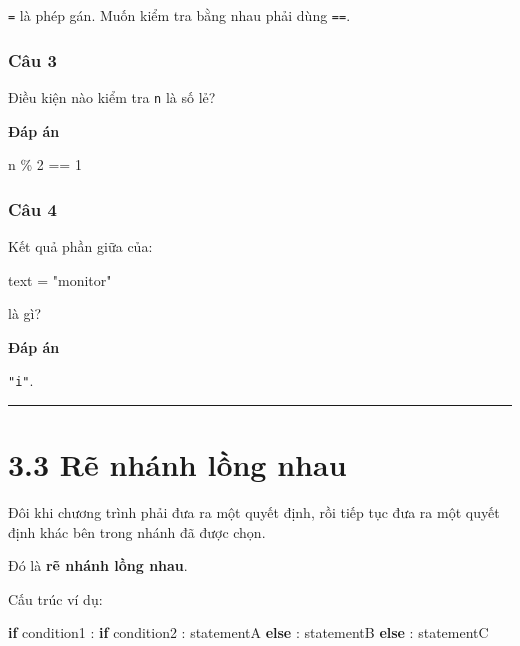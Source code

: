 \documentclass[
  11pt,
  a4paper,
]{article}
\newenvironment{Shaded}{}{}
\newcommand{\ControlFlowTok}[1]{\textcolor[rgb]{0.00,0.44,0.13}{\textbf{#1}}}
\newcommand{\DecValTok}[1]{\textcolor[rgb]{0.25,0.63,0.44}{#1}}
\newcommand{\NormalTok}[1]{#1}
\newcommand{\OperatorTok}[1]{\textcolor[rgb]{0.40,0.40,0.40}{#1}}
\newcommand{\StringTok}[1]{\textcolor[rgb]{0.25,0.44,0.63}{#1}}
\begin{document}
\texttt{=} là phép gán. Muốn kiểm tra bằng nhau phải dùng \texttt{==}.

\subsubsection{Câu 3}\label{cuxe2u-3-1}

Điều kiện nào kiểm tra \texttt{n} là số lẻ?

\textbf{Đáp án}

\begin{Shaded}
\begin{Highlighting}[]
\NormalTok{n }\OperatorTok{\%} \DecValTok{2} \OperatorTok{==} \DecValTok{1}
\end{Highlighting}
\end{Shaded}

\subsubsection{Câu 4}\label{cuxe2u-4-1}

Kết quả phần giữa của:

\begin{Shaded}
\begin{Highlighting}[]
\NormalTok{text }\OperatorTok{=} \StringTok{"monitor"}
\end{Highlighting}
\end{Shaded}

là gì?

\textbf{Đáp án}

\texttt{"i"}.

\begin{center}\rule{0.5\linewidth}{0.5pt}\end{center}

\section{3.3 Rẽ nhánh lồng nhau}\label{rux1ebd-nhuxe1nh-lux1ed3ng-nhau}

Đôi khi chương trình phải đưa ra một quyết định, rồi tiếp tục đưa ra một
quyết định khác bên trong nhánh đã được chọn.

Đó là \textbf{rẽ nhánh lồng nhau}.

Cấu trúc ví dụ:

\begin{Shaded}
\begin{Highlighting}[]
\ControlFlowTok{if}\NormalTok{ condition1 :}
    \ControlFlowTok{if}\NormalTok{ condition2 :}
\NormalTok{        statementA}
    \ControlFlowTok{else}\NormalTok{ :}
\NormalTok{        statementB}
\ControlFlowTok{else}\NormalTok{ :}
\NormalTok{    statementC}
\end{Highlighting}
\end{Shaded}
\end{document}
